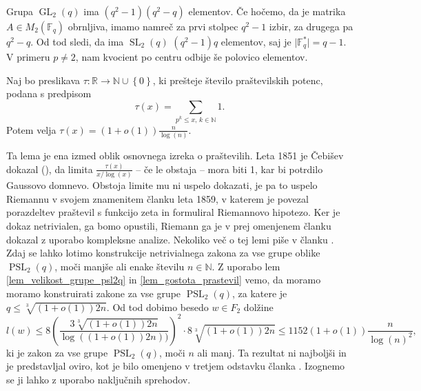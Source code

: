 \documentclass[mat1, tisk]{fmfdelo}
\numberwithin{equation}{section}  %
\begin{document}
    \begin{dokaz}
    Grupa $\operatorname{GL}_2(q)$ ima $(q^2  -1)(q^2 - q)$ elementov. Če hočemo, da je matrika $A \in M_2(\mathbb{F}_q)$ obrnljiva, imamo namreč za prvi stolpec $q^2 -1$ izbir, za drugega pa $q^2 - q$.
    Od tod sledi, da ima $\operatorname{SL}_2(q)$ $(q^2  -1)q$ elementov, saj je $\lvert \mathbb{F}_q^{*} \rvert = q-1$. V primeru $p \neq 2$, nam kvocient po centru odbije še polovico elementov.   
    \end{dokaz}
    
    \begin{lema}
    \label{lem_gostota_prastevil}
    Naj bo preslikava $\tau : \mathbb{R} \to \mathbb{N} \cup \left\{ 0\right\}$, ki prešteje število praštevilskih potenc, podana s predpisom \begin{equation*}
    \tau(x) = \sum_{p^{k} \le x, \, k \in \mathbb{N}} 1.
    \end{equation*}  
     Potem velja $\tau(x) = (1 + o(1)) \frac{n}{\log(n)}$.     
    \end{lema}
    Ta lema je ena izmed oblik osnovnega izreka o praštevilih. Leta 1851 je Čebišev dokazal (\cite[str.~4--5]{Granville_1993}), da limita $\frac{\tau(x)}{x / \log(x)}$ -- če le obstaja -- mora biti 1, kar bi potrdilo Gaussovo domnevo. Obstoja limite mu ni uspelo dokazati, je pa to uspelo Riemannu v svojem znamenitem članku \cite{Riemann_1859} leta 1859, v katerem je povezal porazdeltev praštevil s funkcijo zeta in formuliral Riemannovo hipotezo.
    Ker je dokaz netrivialen, ga bomo opustili, Riemann ga je v prej omenjenem članku dokazal z uporabo kompleksne analize. 
    Nekoliko več o tej lemi piše v članku \cite{Kozma_Thom_2016}.            
    \noindent
    Zdaj se lahko lotimo konstrukcije netrivialnega zakona za vse grupe oblike $\operatorname{PSL}_2(q)$, moči manjše ali enake številu $n \in \mathbb{N}$. Z uporabo lem \ref{lem_velikost_grupe_psl2q} in \ref{lem_gostota_prastevil}
    vemo, da moramo moramo konstruirati zakone za vse grupe $\operatorname{PSL}_2(q)$, za katere je $q \le \sqrt[3]{(1 + o(1)) 2n}$. Od tod dobimo besedo $w \in F_2$ dolžine \begin{equation*}
    l(w) \le 8 \left( \frac{3 \sqrt[3]{(1 + o(1)) 2n}}{\log((1 + o(1)) 2n))}  \right)^2 \cdot 8 \sqrt[3]{(1 + o(1)) 2n} \le 1152 (1 + o(1)) \frac{n}{\log(n)^2},
    \end{equation*}  
    ki je zakon za vse grupe $\operatorname{PSL}_2(q)$, moči $n$ ali manj. Ta rezultat ni najboljši in je predstavljal oviro, kot je bilo omenjeno v tretjem odstavku članka \cite[str.~6]{Bradford_Thom_2017}.
    Izognemo se ji lahko z uporabo naključnih sprehodov.
\end{document}
